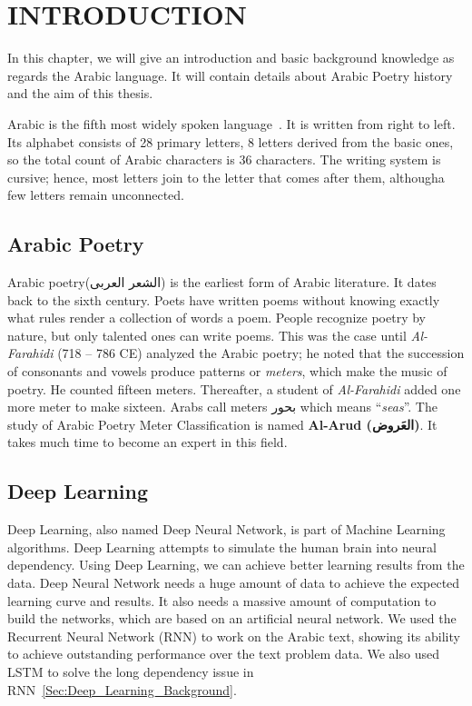 \chapter{\uppercase{Introduction}}\label{Ch:Intro}



In this chapter, we will give an introduction and basic background knowledge as regards the Arabic language. It will contain details about Arabic Poetry history and the aim of this thesis.

  Arabic is the fifth most widely spoken language~\cite{Ethnologue_2017}. It is written from right to left. Its
alphabet consists of 28 primary letters, 8 letters derived from the basic ones, so the total count of Arabic characters is 36 characters. The writing system is cursive; hence, most letters join to the letter that comes
after them, althougha few letters remain unconnected.

\section{Arabic Poetry } %
Arabic poetry(\textarabic{الشعر العربى}) is the earliest form of Arabic literature. It dates back to the sixth century. Poets have written poems without knowing exactly what rules render a collection of words a poem. People recognize poetry by nature, but only talented ones can write poems. This was the case until \textit{Al-Farahidi} (718 – 786 CE) analyzed the Arabic poetry; he noted that the succession of consonants and vowels produce patterns or \textit{meters}, which make the music of poetry. He counted fifteen meters. Thereafter, a student of \textit{Al-Farahidi} added one more meter to make sixteen. Arabs call meters \textarabic{بحور} which means ``\textit{seas}''. The study of Arabic Poetry Meter Classification is named \textbf{Al-Arud (\textarabic{العَروض})}. It takes much time to become an expert in this field. 
\section{Deep Learning}

Deep Learning, also named Deep Neural Network, is part of Machine Learning algorithms. Deep Learning attempts to simulate the human brain into neural dependency.  Using Deep Learning, we can achieve better learning results from the data. Deep Neural Network needs a huge amount of data to achieve the expected learning curve and results. It also needs a massive amount of computation to build the networks, which are based on an artificial neural network. We used the Recurrent Neural Network (RNN) to work on the Arabic text, showing its ability to achieve outstanding performance over the text problem data. We also used LSTM to solve the long dependency issue in RNN~\ref{Sec:Deep_Learning_Background}.

